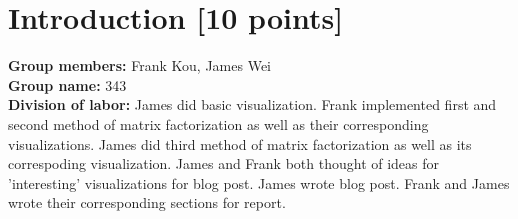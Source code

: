 \newif\ifshowsolutions
\showsolutionstrue







\pagestyle{fancy}




\newpage

\section{Introduction [10 points]}

\medskip
\noindent\textbf{Group members: } Frank Kou, James Wei \\
\noindent\textbf{Group name: } 343 \\
\noindent\textbf{Division of labor: } James did basic visualization. Frank implemented first and second method of matrix factorization as well as their corresponding visualizations. James did third method of matrix factorization as well as its correspoding visualization. James and Frank both thought of ideas for 'interesting' visualizations for blog post. James wrote blog post. Frank and James wrote their corresponding sections for report.
\newpage


